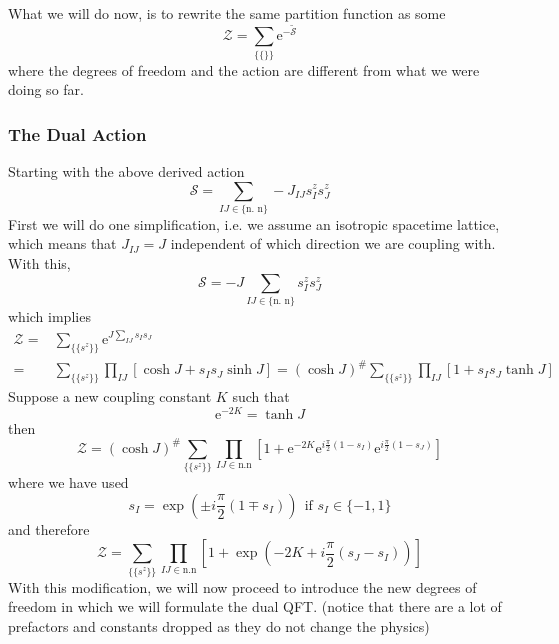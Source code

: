 \documentclass[11pt]{article}
\newcommand{\e}{\mathrm{e}}
\numberwithin{equation}{section}
\begin{document}
What we will do now, is to rewrite the same partition function as some 
\begin{equation*}
    \mathcal{Z} = \sum_{\{\{\}\}} \e^{-\tilde{\mathcal{S}}}
\end{equation*}
where the degrees of freedom and the action are different from what we were doing so far.

\subsubsection{The Dual Action}
Starting with the above derived action 
\begin{equation*}
    \mathcal{S} =  \sum_{IJ\in \{\text{n. n}\}} -J_{IJ} s_I^z s_J^z
\end{equation*}
First we will do one simplification, i.e. we assume an isotropic spacetime lattice, which means that \(J_{IJ} = J\) independent of which direction we are coupling with. With this, 
\begin{equation*}
    \mathcal{S} =  -J\sum_{IJ\in \{\text{n. n}\}} s_I^z s_J^z
\end{equation*} 
which implies 
\begin{align*}
    \mathcal{Z} =& \sum_{\{\{s^z\}\}} \e^{J\sum_{IJ} s_I s_J } \\
    =& \sum_{\{\{s^z\}\}} \prod_{IJ} \left[  \cosh J + s_I s_J \sinh J  \right] = (\cosh J )^{\#}\sum_{\{\{s^z\}\}} \prod_{IJ} \left[  1 + s_I s_J \tanh J  \right]
\end{align*}
Suppose a new coupling constant \(K\) such that 
\begin{equation*}
    \e^{-2K} = \tanh J
\end{equation*}
then 
\begin{equation*}
    \mathcal{Z}= (\cosh J )^{\#}\sum_{\{\{s^z\}\}} \prod_{IJ\in \text{n.n}} \left[  1 + \e^{-2K}\e^{i\frac{\pi}{2} (1-s_I)}\e^{i\frac{\pi}{2} (1-s_J)}  \right]
\end{equation*}
where we have used 
\begin{equation*}
    s_I = \exp\left(\pm i\frac{\pi}{2} (1\mp s_I)\right) ~~\text{if }s_I\in \{-1,1\} 
\end{equation*}
and therefore 
\begin{equation*}
    \mathcal{Z}= \sum_{\{\{s^z\}\}} \prod_{IJ\in \text{n.n}} \left[  1 + \exp\left(-2K + i\frac{\pi}{2} (s_J-s_I)\right)  \right]
\end{equation*}
With this modification, we will now proceed to introduce the new degrees of freedom in which we will formulate the dual QFT. (notice that there are a lot of prefactors and constants dropped as they do not change the physics)\\
\end{document}
